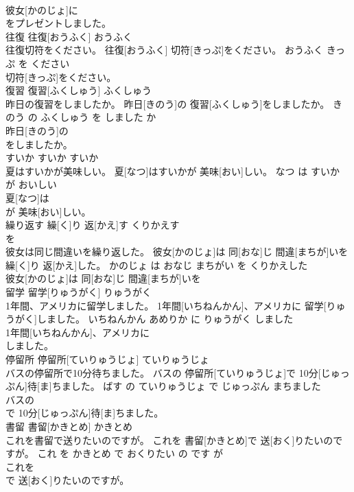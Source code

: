 \documentclass[8pt]{extreport}
\begin{document}
\begin{CJK}{UTF8}{min}
\\	彼女[かのじょ]に
\\	をプレゼントしました。		
\\	往復	往復[おうふく]	おうふく	
\\	往復切符をください。	往復[おうふく] 切符[きっぷ]をください。	おうふく きっぷ を ください	
\\	切符[きっぷ]をください。		
\\	復習	復習[ふくしゅう]	ふくしゅう	
\\	昨日の復習をしましたか。	昨日[きのう]の 復習[ふくしゅう]をしましたか。	きのう の ふくしゅう を しました か	
\\	昨日[きのう]の
\\	をしましたか。		
\\	すいか	すいか	すいか	
\\	夏はすいかが美味しい。	夏[なつ]はすいかが 美味[おい]しい。	なつ は すいか が おいしい	
\\	夏[なつ]は
\\	が 美味[おい]しい。		
\\	繰り返す	繰[く]り 返[かえ]す	くりかえす	
\\	を		
\\	彼女は同じ間違いを繰り返した。	彼女[かのじょ]は 同[おな]じ 間違[まちが]いを 繰[く]り 返[かえ]した。	かのじょ は おなじ まちがい を くりかえした	
\\	彼女[かのじょ]は 同[おな]じ 間違[まちが]いを
\\	留学	留学[りゅうがく]	りゅうがく	
\\	1年間、アメリカに留学しました。	1年間[いちねんかん]、アメリカに 留学[りゅうがく]しました。	いちねんかん あめりか に りゅうがく しました	
\\	1年間[いちねんかん]、アメリカに
\\	しました。		
\\	停留所	停留所[ていりゅうじょ]	ていりゅうじょ	
\\	バスの停留所で10分待ちました。	バスの 停留所[ていりゅうじょ]で 10分[じゅっぷん]待[ま]ちました。	ばす の ていりゅうじょ で じゅっぷん まちました	
\\	バスの
\\	で 10分[じゅっぷん]待[ま]ちました。		
\\	書留	書留[かきとめ]	かきとめ	
\\	これを書留で送りたいのですが。	これを 書留[かきとめ]で 送[おく]りたいのですが。	これ を かきとめ で おくりたい の です が	
\\	これを
\\	で 送[おく]りたいのですが。		

\end{CJK}
\end{document}

